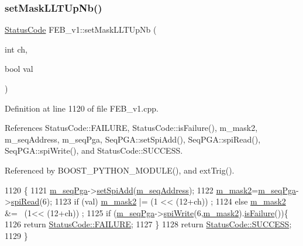 \subsubsection{\texorpdfstring{set\+Mask\+L\+L\+T\+Up\+Nb()}{setMaskLLTUpNb()}}
{\footnotesize\ttfamily \hyperlink{classStatusCode}{Status\+Code} F\+E\+B\+\_\+v1\+::set\+Mask\+L\+L\+T\+Up\+Nb (\begin{DoxyParamCaption}\item[{int}]{ch,  }\item[{bool}]{val }\end{DoxyParamCaption})}



Definition at line 1120 of file F\+E\+B\+\_\+v1.\+cpp.



References Status\+Code\+::\+F\+A\+I\+L\+U\+RE, Status\+Code\+::is\+Failure(), m\+\_\+mask2, m\+\_\+seq\+Address, m\+\_\+seq\+Pga, Seq\+P\+G\+A\+::set\+Spi\+Add(), Seq\+P\+G\+A\+::spi\+Read(), Seq\+P\+G\+A\+::spi\+Write(), and Status\+Code\+::\+S\+U\+C\+C\+E\+SS.



Referenced by B\+O\+O\+S\+T\+\_\+\+P\+Y\+T\+H\+O\+N\+\_\+\+M\+O\+D\+U\+L\+E(), and ext\+Trig().


\begin{DoxyCode}
1120                                                  \{
1121   \hyperlink{classFEB__v1_a6c7804ac86796f233a8393043adf2e77}{m\_seqPga}->\hyperlink{classSeqPGA_ac998ce3a6d9b5f2e88cc8393f8c1df53}{setSpiAdd}(\hyperlink{classFEB__v1_a1c1eb093fd1733b9510fcf8bc5c7ad08}{m\_seqAddress});
1122   \hyperlink{classFEB__v1_a25f03f6de00618dd575fc1f77a9af9ee}{m\_mask2}=\hyperlink{classFEB__v1_a6c7804ac86796f233a8393043adf2e77}{m\_seqPga}->\hyperlink{classSeqPGA_ab3d0e5e5d4014bc7a92588a76b8713d4}{spiRead}(6);
1123   \textcolor{keywordflow}{if} (val)  \hyperlink{classFEB__v1_a25f03f6de00618dd575fc1f77a9af9ee}{m\_mask2} |= (1 << (12+ch))  ;
1124   \textcolor{keywordflow}{else}      \hyperlink{classFEB__v1_a25f03f6de00618dd575fc1f77a9af9ee}{m\_mask2} &= ~(1<< (12+ch)) ;
1125   \textcolor{keywordflow}{if} (\hyperlink{classFEB__v1_a6c7804ac86796f233a8393043adf2e77}{m\_seqPga}->\hyperlink{classSeqPGA_ad4421841ce4ce8b88ad13f63216f0743}{spiWrite}(6,\hyperlink{classFEB__v1_a25f03f6de00618dd575fc1f77a9af9ee}{m\_mask2}).\hyperlink{classStatusCode_a5dd22dc6eb2c52fc4cabc58f6dea2eb7}{isFailure}())\{
1126     \textcolor{keywordflow}{return} \hyperlink{classStatusCode_a6f565cbeadc76d14c72f047e5e85eb4ba3da73d4c469762eb9d3c960368252b26}{StatusCode::FAILURE};
1127   \}
1128   \textcolor{keywordflow}{return} \hyperlink{classStatusCode_a6f565cbeadc76d14c72f047e5e85eb4badd0da38d3ba0d922efd1f4619bc37ad8}{StatusCode::SUCCESS};  
1129 \}
\end{DoxyCode}
\mbox{\label{classObject_ae30fea75683c2d149b6b6d17c09ecd0c}} 
